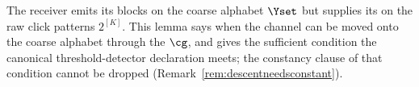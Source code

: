 
The receiver emits its blocks on the coarse alphabet $\Yset$ but supplies its
 on the raw click patterns $2^{[K]}$. This lemma says
when the channel can be moved onto the coarse alphabet through the
 $\cg$, and gives the sufficient condition the
canonical threshold-detector declaration meets; the constancy clause of that
condition cannot be dropped (Remark~\ref{rem:descentneedsconstant}).

